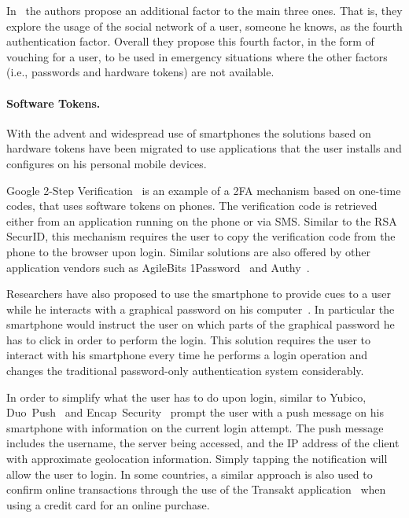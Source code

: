 In~\cite{fourthfactor} the authors propose an additional factor to the main three ones. That is, they explore the usage of the social network of a user, someone he knows, as the fourth authentication factor. Overall they propose this fourth factor, in the form of vouching for a user, to be used in emergency situations where the other factors (i.e., passwords and hardware tokens) are not available.

\paragraph{Software Tokens.}
With the advent and widespread use of smartphones the solutions based on hardware tokens have been migrated to use applications that the user installs and configures on his personal mobile devices.

Google 2-Step Verification~\cite{google_authentication} is an example of a 2FA mechanism based on one-time codes, that uses software tokens on phones. The verification code is retrieved either from an application running on the phone or via SMS. Similar to the RSA SecurID, this mechanism requires the user to copy the verification code from the phone to the browser upon login. Similar solutions are also offered by other application vendors such as AgileBits 1Password~\cite{1password} and Authy~\cite{authy}.

Researchers have also proposed to use the smartphone to provide cues to a user while he interacts with a graphical password on his computer~\cite{graphpass}. In particular the smartphone would instruct the user on which parts of the graphical password he has to click in order to perform the login. This solution requires the user to interact with his smartphone every time he performs a login operation and changes the traditional password-only authentication system considerably.

In order to simplify what the user has to do upon login, similar to Yubico, Duo~Push~\cite{duosecurity} and Encap~Security~\cite{encap} prompt the user with a push message on his smartphone with information on the current login attempt. The push message includes the username, the server being accessed, and the IP address of the client with approximate geolocation information. Simply tapping the notification will allow the user to login. In some countries, a similar approach is also used to confirm online transactions through the use of the Transakt application~\cite{transakt} when using a credit card for an online purchase.


